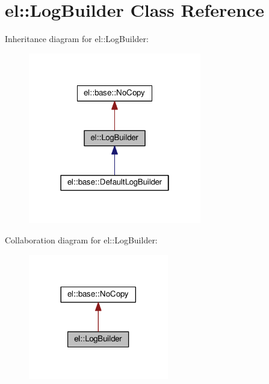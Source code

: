 \hypertarget{classel_1_1_log_builder}{}\section{el\+:\+:Log\+Builder Class Reference}
\label{classel_1_1_log_builder}


Inheritance diagram for el\+:\+:Log\+Builder\+:
\nopagebreak
\begin{figure}[H]
\begin{center}
\leavevmode
\includegraphics[width=214pt]{classel_1_1_log_builder__inherit__graph}
\end{center}
\end{figure}


Collaboration diagram for el\+:\+:Log\+Builder\+:
\nopagebreak
\begin{figure}[H]
\begin{center}
\leavevmode
\includegraphics[width=173pt]{classel_1_1_log_builder__coll__graph}
\end{center}
\end{figure}

